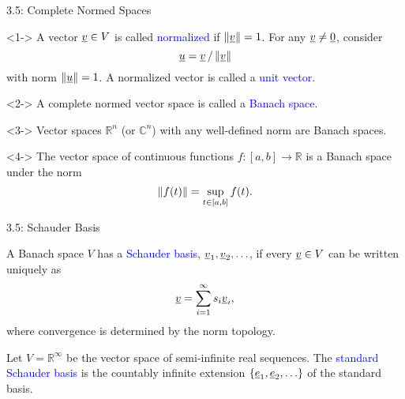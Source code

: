 \documentclass[10pt,english,aspectratio=169]{beamer}
\begin{document}
\begin{frame}{3.5: Complete Normed Spaces}

\begin{definition}<1->
A vector $\underline{v} \in V$ is called \textcolor{blue}{normalized} if $\left\| \underline{v} \right\| = 1$.
For any $\underline{v} \neq \underline{0}$, consider \vspace{-2mm}
\begin{equation*}
\underline{u} = \underline{v}\, / \left\| \underline{v} \right\|
\end{equation*}
with norm $\left\| \underline{u} \right\| = 1$.
A normalized vector is called a \textcolor{blue}{unit vector}.
\end{definition}

\begin{definition}<2->
A complete normed vector space is called a \textcolor{blue}{Banach space}.
\end{definition}

\begin{example}<3->
Vector spaces $\mathbb{R}^n$ (or $\mathbb{C}^n$) with any well-defined norm are Banach spaces.
\end{example}

\begin{example}<4->
The vector space of continuous functions $f \colon [a,b] \to \mathbb{R}$ is a Banach space under the norm \vspace{-2.5mm}
\[ \left\| f(t) \right\| = \sup_{t\in [a,b]} f(t). \vspace*{-0.5mm}\]
\end{example}

\end{frame}

\begin{frame}{3.5: Schauder Basis}

\begin{definition}
A Banach space $V$ has a \textcolor{blue}{Schauder basis}, $\underline{v}_1, \underline{v}_2, \ldots$, if every $\underline{v} \in V$ can be written uniquely as
\[ \underline{v} = \sum_{i=1}^\infty s_i \underline{v}_i, \]
where convergence is determined by the norm topology.
\end{definition}

\begin{example}
Let $V = \mathbb{R}^\infty$ be the vector space of semi-infinite real sequences.
The \textcolor{blue}{standard Schauder basis} is the countably infinite extension $\{\underline{e}_1 ,\underline{e}_2, \ldots \}$ of the standard basis.
\end{example}


\end{frame}
\end{document}
